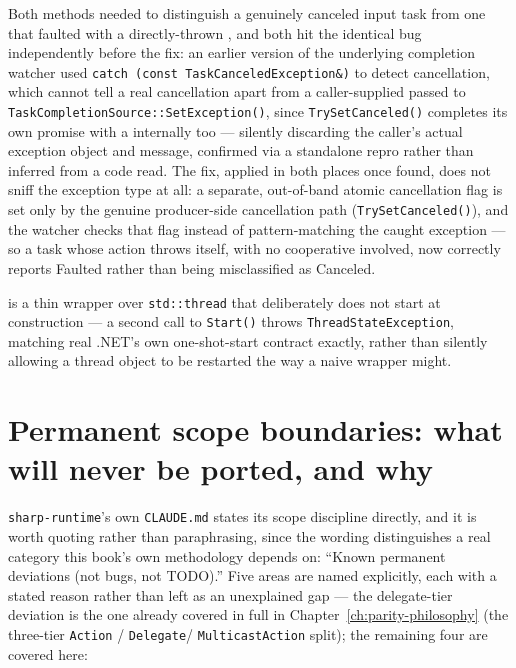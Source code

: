 Both methods needed to distinguish a genuinely canceled input task from one that faulted with a
directly-thrown , and both hit the identical bug independently
before the fix: an earlier version of the underlying completion watcher used
\texttt{catch (const TaskCanceledException\&)} to detect cancellation, which cannot tell a real
cancellation apart from a caller-supplied  passed to
\texttt{TaskCompletionSource::SetException()}, since \texttt{TrySetCanceled()} completes its own
promise with a  internally too --- silently discarding the
caller's actual exception object and message, confirmed via a standalone repro rather than
inferred from a code read. The fix, applied in both places once found, does not sniff the
exception type at all: a separate, out-of-band atomic cancellation flag is set only by the
genuine producer-side cancellation path (\texttt{TrySetCanceled()}), and the watcher
checks that flag instead of pattern-matching the caught exception --- so a task whose action
throws  itself, with no cooperative
 involved, now correctly reports Faulted rather than being
misclassified as Canceled.

 is a thin wrapper over \texttt{std::thread} that deliberately does
not start at construction --- a second call to \texttt{Start()} throws
\texttt{ThreadStateException}, matching real .NET's own one-shot-start contract exactly,
rather than silently allowing a thread object to be restarted the way a naive wrapper might.

\section{Permanent scope boundaries: what will never be ported, and why}

\texttt{sharp-runtime}'s own \texttt{CLAUDE.md} states its scope discipline directly, and it is
worth quoting rather than paraphrasing, since the wording distinguishes a real category this
book's own methodology depends on: ``Known permanent deviations (not bugs, not TODO).'' Five
areas are named explicitly, each with a stated reason rather than left as an unexplained gap ---
the delegate-tier deviation is the one already covered in full in
Chapter~\ref{ch:parity-philosophy} (the three-tier \texttt{Action} / \texttt{Delegate}/
\texttt{MulticastAction} split); the remaining four are covered here:

